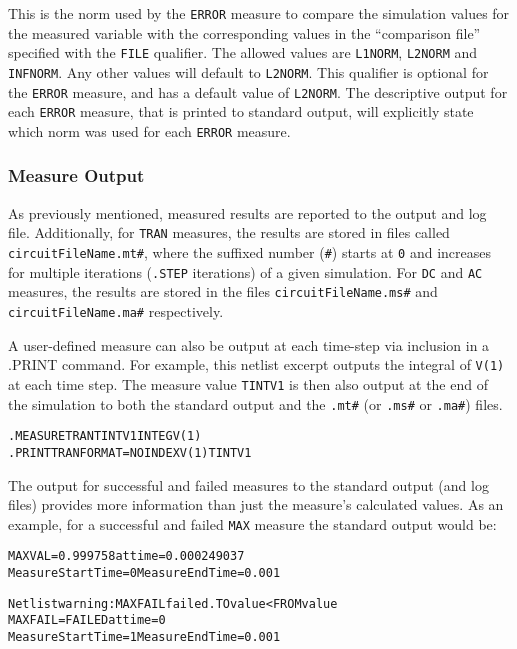 \begin{Command}
\begin{Arguments}
This is the norm used by the {\tt ERROR} measure to compare the simulation
values for the measured variable with the corresponding values in the ``comparison file'' 
specified with the {\tt FILE} qualifier.  The allowed values are {\tt L1NORM},
{\tt L2NORM} and {\tt INFNORM}.  Any other values will default to {\tt L2NORM}.
This qualifier is optional for the {\tt ERROR} measure, and has a default value of
{\tt L2NORM}.  The descriptive output for each {\tt ERROR} measure, that is printed 
to standard output, will explicitly state which norm was used for each {\tt ERROR} 
measure. 

\end{Arguments}

\end {Command}

\subsubsection{Measure Output}
\label{Measure_Measurement_Output}
As previously mentioned, measured results are reported to the output and log file.  
Additionally, for \texttt{TRAN} measures, the results are stored in files called 
\texttt{circuitFileName.mt\#}, where the suffixed number (\texttt{\#}) starts at 
\texttt{0} and increases for multiple iterations (\texttt{.STEP} iterations) of 
a given simulation. For \texttt{DC} and \texttt{AC} measures, the results are stored in the 
files \texttt{circuitFileName.ms\#} and \texttt{circuitFileName.ma\#} respectively.

A user-defined measure can also be output at each time-step via inclusion in a .PRINT command.  
For example, this netlist excerpt outputs the integral of {\tt V(1)} at each time step.  The
measure value {\tt TINTV1} is then also output at the end of the simulation to both the
standard output and the \texttt{.mt\#} (or \texttt{.ms\#} or \texttt{.ma\#}) files.
\begin{alltt}
.MEASURE TRAN TINTV1 INTEG V(1) 
.PRINT TRAN FORMAT=NOINDEX V(1) TINTV1 
\end{alltt}

The output for successful and failed measures to the standard output (and log files) provides
more information than just the measure's calculated values.  As an example, for a 
successful and failed {\tt MAX} measure the standard output would be:

\begin{alltt}
MAXVAL = 0.999758 at time = 0.000249037
Measure Start Time= 0	Measure End Time= 0.001

Netlist warning: MAXFAIL failed. TO value < FROM value
MAXFAIL = FAILED at time = 0
Measure Start Time= 1	Measure End Time= 0.001
\end{alltt}

